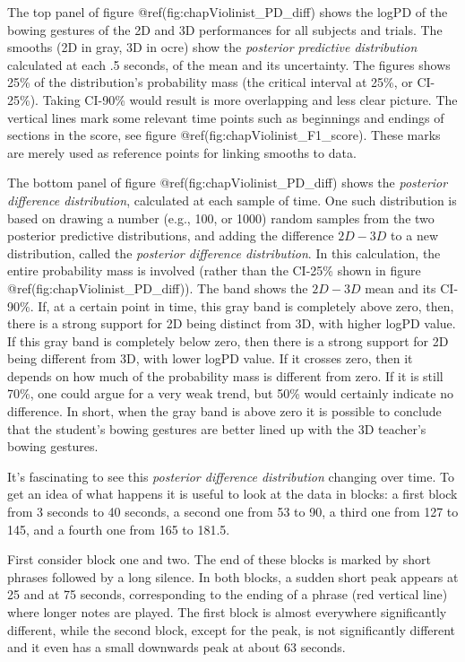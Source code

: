 \documentclass[
]{book}
\theoremstyle{definition}
\theoremstyle{definition}
\theoremstyle{definition}
\theoremstyle{definition}
\theoremstyle{remark}
\begin{document}
The top panel of figure @ref(fig:chapViolinist\_PD\_diff) shows the logPD of the bowing gestures of the 2D and 3D performances for all subjects and trials.
The smooths (2D in gray, 3D in ocre) show the \emph{posterior predictive distribution} calculated at each .5 seconds, of the mean and its uncertainty.
The figures shows 25\% of the distribution's probability mass (the critical interval at 25\%, or CI-25\%). Taking CI-90\% would result is more overlapping and less clear picture.
The vertical lines mark some relevant time points such as beginnings and endings of sections in the score, see figure @ref(fig:chapViolinist\_F1\_score). These marks are merely used as reference points for linking smooths to data.

The bottom panel of figure @ref(fig:chapViolinist\_PD\_diff) shows the \emph{posterior difference distribution}, calculated at each sample of time.
One such distribution is based on drawing a number (e.g., 100, or 1000) random samples from the two posterior predictive distributions, and adding the difference \(2D - 3D\) to a new distribution, called the \emph{posterior difference distribution}.
In this calculation, the entire probability mass is involved (rather than the CI-25\% shown in figure @ref(fig:chapViolinist\_PD\_diff)).
The band shows the \(2D-3D\) mean and its CI-90\%.
If, at a certain point in time, this gray band is completely above zero, then, there is a strong support for 2D being distinct from 3D, with higher logPD value.
If this gray band is completely below zero, then there is a strong support for 2D being different from 3D, with lower logPD value.
If it crosses zero, then it depends on how much of the probability mass is different from zero. If it is still 70\%, one could argue for a very weak trend, but 50\% would certainly indicate no difference.
In short, when the gray band is above zero it is possible to conclude that the student's bowing gestures are better lined up with the 3D teacher's bowing gestures.

It's fascinating to see this \emph{posterior difference distribution} changing over time.
To get an idea of what happens it is useful to look at the data in blocks:
a first block from 3 seconds to 40 seconds,
a second one from 53 to 90,
a third one from 127 to 145, and
a fourth one from 165 to 181.5.

First consider block one and two.
The end of these blocks is marked by short phrases followed by a long silence.
In both blocks, a sudden short peak appears at 25 and at 75 seconds, corresponding to the ending of a phrase (red vertical line) where longer notes are played.
The first block is almost everywhere significantly different, while the second block, except for the peak, is not significantly different and it even has a small downwards peak at about 63 seconds.
\end{document}
